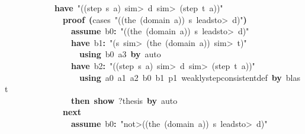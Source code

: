 \documentclass{article}
\newcommand{\syntaxKEYWORDA}[1]{\textcolor[rgb]{0.0,0.4,0.6}{\textbf{#1}}}
\newcommand{\syntaxKEYWORDC}[1]{\textcolor[rgb]{0.0,0.6,1.0}{\textbf{#1}}}
\newcommand{\syntaxLITERALA}[1]{\textcolor[rgb]{1.0,0.0,0.8}{#1}}
\newcommand{\syntaxOPERATOR}[1]{\textcolor[rgb]{0.0,0.0,0.0}{\textbf{#1}}}
\newcommand{\syntaxKEYWORDA}[1]{\textcolor[rgb]{0.0,0.4,0.6}{\textbf{#1}}}
\newcommand{\syntaxKEYWORDC}[1]{\textcolor[rgb]{0.0,0.6,1.0}{\textbf{#1}}}
\newcommand{\syntaxLITERALA}[1]{\textcolor[rgb]{1.0,0.0,0.8}{#1}}
\newcommand{\syntaxOPERATOR}[1]{\textcolor[rgb]{0.0,0.0,0.0}{\textbf{#1}}}
\newcommand{\syntaxKEYWORDA}[1]{\textcolor[rgb]{0.0,0.4,0.6}{\textbf{#1}}}
\newcommand{\syntaxKEYWORDC}[1]{\textcolor[rgb]{0.0,0.6,1.0}{\textbf{#1}}}
\newcommand{\syntaxLITERALA}[1]{\textcolor[rgb]{1.0,0.0,0.8}{#1}}
\newcommand{\syntaxOPERATOR}[1]{\textcolor[rgb]{0.0,0.0,0.0}{\textbf{#1}}}
\newcommand{\syntaxKEYWORDA}[1]{\textcolor[rgb]{0.0,0.4,0.6}{#1}}
\newcommand{\syntaxKEYWORDC}[1]{\textcolor[rgb]{0.0,0.6,1.0}{#1}}
\newcommand{\syntaxLITERALA}[1]{\textcolor[rgb]{1.0,0.0,0.8}{\textbf{#1}}}
\newcommand{\syntaxOPERATOR}[1]{\textcolor[rgb]{0.0,0.0,0.0}{#1}}
\newcommand{\syntaxKEYWORDA}[1]{\textcolor[rgb]{0.0,0.4,0.6}{\textbf{#1}}}
\newcommand{\syntaxKEYWORDC}[1]{\textcolor[rgb]{0.0,0.6,1.0}{\textbf{#1}}}
\newcommand{\syntaxLITERALA}[1]{\textcolor[rgb]{1.0,0.0,0.8}{#1}}
\newcommand{\syntaxOPERATOR}[1]{\textcolor[rgb]{0.0,0.0,0.0}{\textbf{#1}}}
\newcommand{\syntaxKEYWORDA}[1]{\textcolor[rgb]{0.0,0.4,0.6}{\textbf{#1}}}
\newcommand{\syntaxKEYWORDC}[1]{\textcolor[rgb]{0.0,0.6,1.0}{\textbf{#1}}}
\newcommand{\syntaxLITERALA}[1]{\textcolor[rgb]{1.0,0.0,0.8}{#1}}
\newcommand{\syntaxOPERATOR}[1]{\textcolor[rgb]{0.0,0.0,0.0}{\textbf{#1}}}
\begin{document}
{\ }{\ }{\ }{\ }{\ }{\ }{\ }{\ }{\ }{\ }{\ }{\ }\syntaxKEYWORDA{have}{\ }\syntaxLITERALA{"((step{\ }s{\ }a){\ }\<sim>{\ }d{\ }\<sim>{\ }(step{\ }t{\ }a))"}\hspace*{\fill}\\
{\ }{\ }{\ }{\ }{\ }{\ }{\ }{\ }{\ }{\ }{\ }{\ }{\ }{\ }\syntaxKEYWORDA{proof}{\ }\syntaxOPERATOR{(}cases{\ }\syntaxLITERALA{"((the{\ }(domain{\ }a)){\ }\usebox{\atbox}{\ }s{\ }\<leadsto>{\ }d)"}\syntaxOPERATOR{)}\hspace*{\fill}\\
{\ }{\ }{\ }{\ }{\ }{\ }{\ }{\ }{\ }{\ }{\ }{\ }{\ }{\ }{\ }{\ }\syntaxKEYWORDC{assume}{\ }b0\syntaxOPERATOR{:}{\ }\syntaxLITERALA{"((the{\ }(domain{\ }a)){\ }\usebox{\atbox}{\ }s{\ }\<leadsto>{\ }d)"}\hspace*{\fill}\\
{\ }{\ }{\ }{\ }{\ }{\ }{\ }{\ }{\ }{\ }{\ }{\ }{\ }{\ }{\ }{\ }\syntaxKEYWORDA{have}{\ }b1\syntaxOPERATOR{:}{\ }\syntaxLITERALA{"(s{\ }\<sim>{\ }(the{\ }(domain{\ }a)){\ }\<sim>{\ }t)"}\hspace*{\fill}\\
{\ }{\ }{\ }{\ }{\ }{\ }{\ }{\ }{\ }{\ }{\ }{\ }{\ }{\ }{\ }{\ }{\ }{\ }\syntaxKEYWORDA{using}{\ }b0{\ }a3{\ }\syntaxKEYWORDA{by}{\ }auto\hspace*{\fill}\\
{\ }{\ }{\ }{\ }{\ }{\ }{\ }{\ }{\ }{\ }{\ }{\ }{\ }{\ }{\ }{\ }\syntaxKEYWORDA{have}{\ }b2\syntaxOPERATOR{:}{\ }\syntaxLITERALA{"((step{\ }s{\ }a){\ }\<sim>{\ }d{\ }\<sim>{\ }(step{\ }t{\ }a))"}\hspace*{\fill}\\
{\ }{\ }{\ }{\ }{\ }{\ }{\ }{\ }{\ }{\ }{\ }{\ }{\ }{\ }{\ }{\ }{\ }{\ }\syntaxKEYWORDA{using}{\ }a0{\ }a1{\ }a2{\ }b0{\ }b1{\ }p1{\ }weakly\usebox{\underscorebox}step\usebox{\underscorebox}consistent\usebox{\underscorebox}def{\ }\syntaxKEYWORDA{by}{\ }blast\hspace*{\fill}\\
{\ }{\ }{\ }{\ }{\ }{\ }{\ }{\ }{\ }{\ }{\ }{\ }{\ }{\ }{\ }{\ }\syntaxKEYWORDA{then}{\ }\syntaxKEYWORDC{show}{\ }?thesis{\ }\syntaxKEYWORDA{by}{\ }auto\hspace*{\fill}\\
{\ }{\ }{\ }{\ }{\ }{\ }{\ }{\ }{\ }{\ }{\ }{\ }{\ }{\ }\syntaxKEYWORDA{next}\hspace*{\fill}\\
{\ }{\ }{\ }{\ }{\ }{\ }{\ }{\ }{\ }{\ }{\ }{\ }{\ }{\ }{\ }{\ }\syntaxKEYWORDC{assume}{\ }b0\syntaxOPERATOR{:}{\ }\syntaxLITERALA{"\<not>((the{\ }(domain{\ }a)){\ }\usebox{\atbox}{\ }s{\ }\<leadsto>{\ }d)"}\hspace*{\fill}\\
\end{document}
